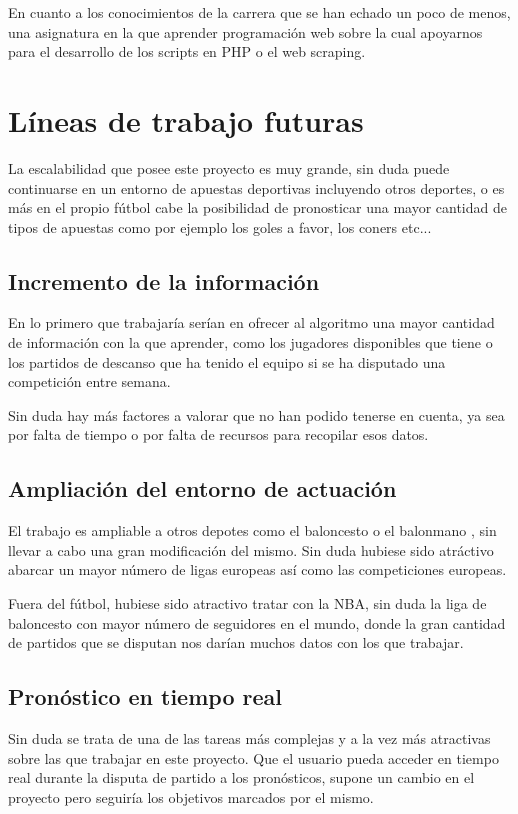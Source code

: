 En cuanto a los conocimientos de la carrera que se han echado un poco de menos, una asignatura en la que aprender programación web sobre la cual apoyarnos para el desarrollo de los scripts en PHP o el web scraping.
\section{Líneas de trabajo futuras}
La escalabilidad que posee este proyecto es muy grande, sin duda puede continuarse en un entorno de apuestas deportivas incluyendo otros deportes, o es más en el propio fútbol cabe la posibilidad de pronosticar una mayor cantidad de tipos de apuestas como por ejemplo los goles a favor, los coners etc...

\subsection{Incremento de la información}
En lo primero que trabajaría serían en ofrecer al algoritmo una mayor cantidad de información con la que aprender, como los jugadores disponibles que tiene o los partidos de descanso que ha tenido el equipo si se ha disputado una competición entre semana. 

Sin duda hay más factores a valorar que no han podido tenerse en cuenta, ya sea por falta de tiempo o por falta de recursos para recopilar esos datos.

\subsection{Ampliación del entorno de actuación}
El trabajo es ampliable a otros depotes como el baloncesto o el balonmano , sin llevar a cabo una gran modificación del mismo. Sin duda hubiese sido atráctivo abarcar un mayor número de ligas europeas así como las competiciones europeas.

Fuera del fútbol, hubiese sido atractivo tratar con la NBA, sin duda la liga de baloncesto con mayor número de seguidores en el mundo, donde la gran cantidad de partidos que se disputan nos darían muchos datos con los que trabajar.

\subsection{Pronóstico en tiempo real}
Sin duda se trata de una de las tareas más complejas y a la vez más atractivas sobre las que trabajar en este proyecto. Que el usuario pueda acceder en tiempo real durante la disputa de partido a los pronósticos, supone un cambio en el proyecto pero seguiría los objetivos marcados por el mismo.